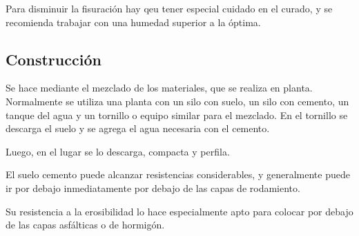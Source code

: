 \documentclass[../main.tex]{subfiles}
\begin{document}
Para disminuir la fisuración hay qeu tener especial cuidado en el curado, y se
recomienda trabajar con una humedad superior a la óptima.

\subsection{Construcción}

Se hace mediante el mezclado de los materiales, que se realiza en planta. 
Normalmente se utiliza una planta con un silo con suelo, un silo con cemento, un
tanque del agua y un tornillo o equipo similar para el mezclado. En el
tornillo se descarga el suelo y se agrega el agua necesaria con el cemento.

Luego, en el lugar se lo descarga, compacta y perfila.

El suelo cemento puede alcanzar resistencias considerables, y generalmente puede
ir por debajo inmediatamente por debajo de las capas de rodamiento.

Su resistencia a la erosibilidad lo hace especialmente apto para colocar por 
debajo de las capas asfálticas o de hormigón.
\end{document}
